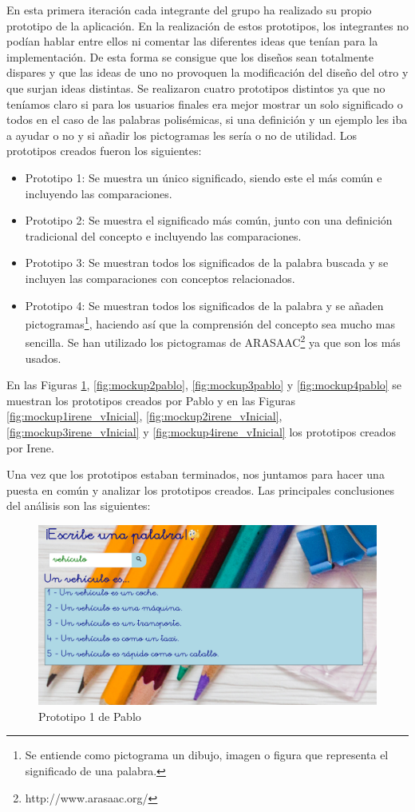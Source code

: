 En esta primera iteración cada integrante del grupo ha realizado su propio prototipo de la aplicación. En la realización de estos prototipos, los integrantes no podían hablar entre ellos ni comentar las diferentes ideas que tenían para la implementación. De esta forma se consigue que los diseños sean totalmente dispares y que las ideas de uno no provoquen la modificación del diseño del otro y que surjan ideas distintas.
Se realizaron cuatro prototipos distintos ya que no teníamos claro si para los usuarios finales era mejor mostrar un solo significado o todos en el caso de las palabras polisémicas, si una definición y un ejemplo les iba a ayudar o no y si añadir los pictogramas les sería o no de utilidad.
Los prototipos creados fueron los siguientes:
\begin{itemize}
	\item Prototipo 1: Se muestra un único significado, siendo este el más común e incluyendo las comparaciones.
	\item Prototipo 2: Se muestra el significado más común, junto con una definición tradicional del concepto e incluyendo las comparaciones.
	\item Prototipo 3: Se muestran todos los significados de la palabra buscada y se incluyen  las comparaciones con conceptos relacionados.
	\item Prototipo 4: Se muestran todos los significados de la palabra y se añaden pictogramas\footnote{Se entiende como pictograma un dibujo, imagen o figura que representa el significado de una palabra.}, haciendo así que la comprensión del concepto sea mucho mas sencilla. Se han utilizado los pictogramas de ARASAAC\footnote{http://www.arasaac.org/} ya que son los más usados.
	
\end{itemize}

En las Figuras \ref{fig:mockup1pablo}, \ref{fig:mockup2pablo}, \ref{fig:mockup3pablo} y \ref{fig:mockup4pablo} se muestran los prototipos creados por Pablo y en las Figuras \ref{fig:mockup1irene_vInicial}, \ref{fig:mockup2irene_vInicial},  \ref{fig:mockup3irene_vInicial} y \ref{fig:mockup4irene_vInicial} los prototipos creados por Irene.


 
Una vez que los prototipos estaban terminados, nos juntamos para hacer una puesta en común y analizar los prototipos creados. 
Las principales conclusiones del análisis son las siguientes:

\begin{figure}[!t]
	\includegraphics[width=.8\textwidth]{Imagenes/Bitmap/Mockups/mockup1_pablo}
	\centering
	\caption{Prototipo 1 de Pablo}
	\label{fig:mockup1pablo}
\end{figure}

